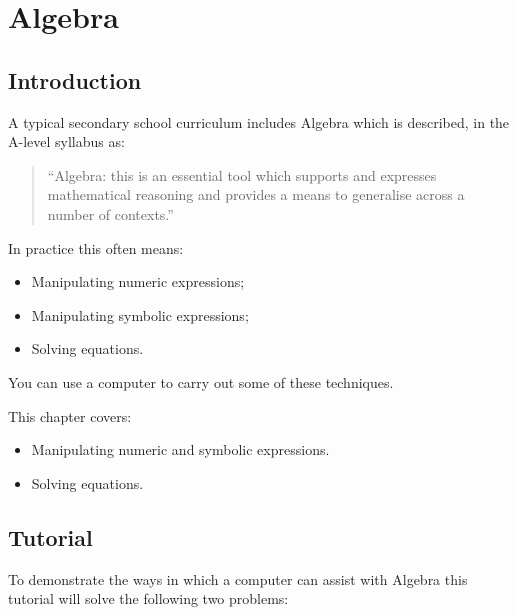 \chapter{Algebra}
\label{chp:algebra}

\section{Introduction}

A typical secondary school curriculum includes Algebra which
is described, in the A-level syllabus
as:

\begin{quote}
``Algebra: this is an essential tool which supports and expresses mathematical
reasoning and provides a means to generalise across a number of contexts.''
\end{quote}

In practice this often means:
\begin{itemize}
\item Manipulating numeric expressions;
\item Manipulating symbolic expressions;
\item Solving equations.
\end{itemize}


You can use a computer to carry out some of these techniques.

\begin{note}
This chapter covers:

\begin{itemize}
\item Manipulating numeric and symbolic expressions.
\item Solving equations.
\end{itemize}
\end{note}

\section{Tutorial}

To demonstrate the ways in which a computer can assist with Algebra this
tutorial
will solve the following two problems:

